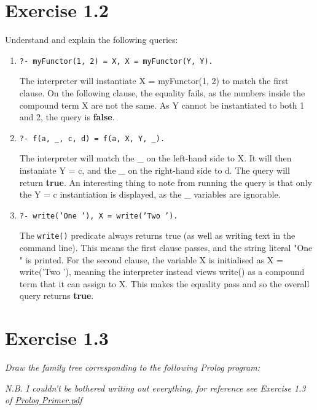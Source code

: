 \documentclass{report}
\newcommand{\code}[1]{\texttt{#1}}
\begin{document}
\section{\textbf{Exercise 1.2}}
Understand and explain the following queries:
\begin{enumerate}[label=(\alph*)]

    \item \code{?- myFunctor(1, 2) = X, X = myFunctor(Y, Y).}
    
    The interpreter will instantiate X = myFunctor(1, 2) to match the first clause. On the following clause, the equality fails, as the numbers inside the compound term X are not the same. As Y cannot be instantiated to both 1 and 2, the query is \textbf{false}.

    \item \code{?- f(a, \_, c, d) = f(a, X, Y, \_).}
    
    The interpreter will match the \_ on the left-hand side to X. It will then instaniate Y = c, and the \_ on the right-hand side to d. The query will return \textbf{true}. An interesting thing to note from running the query is that only the Y = c instantiation is displayed, as the \_ variables are ignorable.

    \item \code{?- write('One '), X = write('Two ').}
    
    The \code{write()} predicate always returns true (as well as writing text in the command line). This means the first clause passes, and the string literal "One " is printed. For the second clause, the variable X is initialised as X = write('Two '), meaning the interpreter instead views write() as a compound term that it can assign to X. This makes the equality pass and so the overall query returns \textbf{true}.

\end{enumerate}

\section{\textbf{Exercise 1.3}}
\emph{Draw the family tree corresponding to the following Prolog program:}

\emph{N.B. I couldn't be bothered writing out everything, for reference see Exercise 1.3 of \href{run:./Prolog_Primer.pdf}{Prolog Primer.pdf}}
\end{document}
